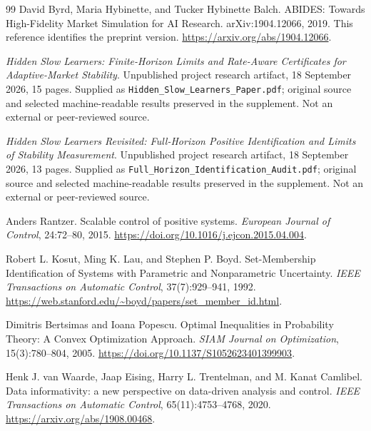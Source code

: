 \documentclass[11pt,a4paper]{article}
\theoremstyle{definition}
\theoremstyle{remark}
\begin{document}
\begin{thebibliography}{99}
David Byrd, Maria Hybinette, and Tucker Hybinette Balch.
\newblock ABIDES: Towards High-Fidelity Market Simulation for AI Research.
\newblock arXiv:1904.12066, 2019. This reference identifies the preprint version.
\newblock \url{https://arxiv.org/abs/1904.12066}.

\emph{Hidden Slow Learners: Finite-Horizon Limits and Rate-Aware Certificates for Adaptive-Market Stability}.
\newblock Unpublished project research artifact, 18 September 2026, 15 pages.
\newblock Supplied as \texttt{Hidden\_Slow\_Learners\_Paper.pdf}; original source and selected machine-readable results preserved in the supplement. Not an external or peer-reviewed source.

\emph{Hidden Slow Learners Revisited: Full-Horizon Positive Identification and Limits of Stability Measurement}.
\newblock Unpublished project research artifact, 18 September 2026, 13 pages.
\newblock Supplied as \texttt{Full\_Horizon\_Identification\_Audit.pdf}; original source and selected machine-readable results preserved in the supplement. Not an external or peer-reviewed source.

Anders Rantzer.
\newblock Scalable control of positive systems.
\newblock \emph{European Journal of Control}, 24:72--80, 2015.
\newblock \url{https://doi.org/10.1016/j.ejcon.2015.04.004}.

Robert L. Kosut, Ming K. Lau, and Stephen P. Boyd.
\newblock Set-Membership Identification of Systems with Parametric and Nonparametric Uncertainty.
\newblock \emph{IEEE Transactions on Automatic Control}, 37(7):929--941, 1992.
\newblock \url{https://web.stanford.edu/~boyd/papers/set_member_id.html}.

Dimitris Bertsimas and Ioana Popescu.
\newblock Optimal Inequalities in Probability Theory: A Convex Optimization Approach.
\newblock \emph{SIAM Journal on Optimization}, 15(3):780--804, 2005.
\newblock \url{https://doi.org/10.1137/S1052623401399903}.

Henk J. van Waarde, Jaap Eising, Harry L. Trentelman, and M. Kanat Camlibel.
\newblock Data informativity: a new perspective on data-driven analysis and control.
\newblock \emph{IEEE Transactions on Automatic Control}, 65(11):4753--4768, 2020.
\newblock \url{https://arxiv.org/abs/1908.00468}.


\end{thebibliography}
\end{document}
